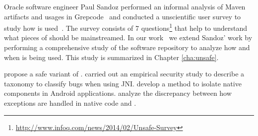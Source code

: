 Oracle software engineer Paul Sandoz performed an informal analysis of
Maven artifacts and usages in Grepcode~\citep{sandoz-personal-communication}
and conducted a unscientific user survey to study how \unsafe{} is used~\citep{psandoz14}.
The survey consists of 7 questions\footnote{\url{http://www.infoq.com/news/2014/02/Unsafe-Survey}} 
that help to understand what pieces of \smu{} should be mainstreamed.
In our work~\citep{mastrangeloUseYourOwn2015} we extend Sandoz' work
by performing a comprehensive study of the \mavencentral{}
software repository to analyze how and when \smu{} is being used.
This study is summarized in Chapter \ref{cha:unsafe}.


\cite{tanSafeJavaNative2006} propose a safe variant of \jni{}.
\cite{tanEmpiricalSecurityStudy2008,kondohFindingBugsJava2008} carried out an empirical security study to describe a taxonomy to classify bugs when using JNI.
\cite{sunNativeGuardProtectingAndroid2014} develop a method to isolate native components in Android applications.
\cite{liFindingBugsExceptional2009} analyze the discrepancy between how exceptions are handled in native code and \java{}.

